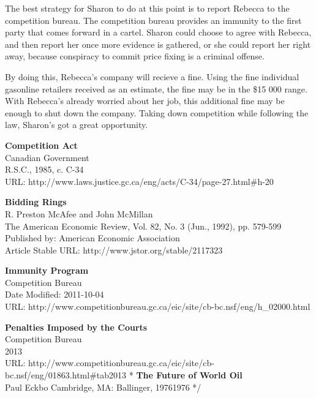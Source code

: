 \documentclass[12pt]{article}
\newcommand\bold[1]{\textbf{#1}}
\begin{document}
The best strategy for Sharon to do at this point is to report Rebecca to the competition bureau. The competition bureau provides an immunity \cite{immunity} to the first party that comes forward in a cartel. Sharon could choose to agree with Rebecca, and then report her once more evidence is gathered, or she could report her right away, because conspiracy to commit price fixing is a criminal offense.\cite[45.1.a]{compAct}

By doing this, Rebecca's company will recieve a fine. Using the fine individual gasonline retailers received as an estimate, the fine may be in the \$15 000  range.\cite[2013]{penalties} With Rebecca's already worried about her job, this additional fine may be enough to shut down the company. Taking down competition while following the law, Sharon's got a great opportunity.

\begin{thebibliography}{1}

\bold{Competition Act}\\
Canadian Government\\
R.S.C., 1985, c. C-34\\
URL: http://www.laws.justice.gc.ca/eng/acts/C-34/page-27.html\#h-20


\bold{Bidding Rings}\\
R. Preston McAfee and John McMillan\\
The American Economic Review, Vol. 82, No. 3 (Jun., 1992), pp. 579-599\\
Published by: American Economic Association\\
Article Stable URL: http://www.jstor.org/stable/2117323

\bold{Immunity Program}\\
Competition Bureau\\
Date Modified: 2011-10-04\\
URL: http://www.competitionbureau.gc.ca/eic/site/cb-bc.nsf/eng/h\_02000.html

\bold{Penalties Imposed by the Courts}\\
Competition Bureau\\
2013\\
URL: http://www.competitionbureau.gc.ca/eic/site/cb-bc.nsf/eng/01863.html\#tab2013
\/*
\bold{The Future of World Oil}\\
Paul Eckbo
Cambridge, MA: Ballinger, 19761976
*/
  \end{thebibliography}
\end{document}
